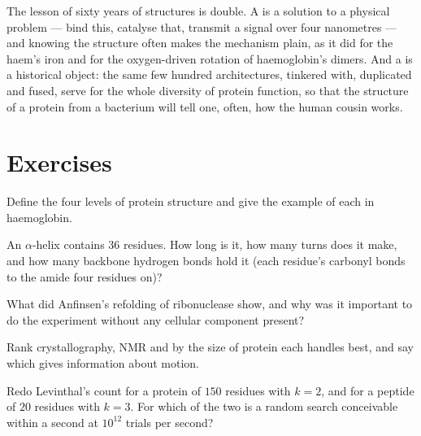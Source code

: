 \begin{remark}\label{rem:b3:structural-biology:sf}
The lesson of sixty years of structures is double. A  is a
solution to a physical problem --- bind this, catalyse that, transmit a
signal over four nanometres --- and knowing the structure often makes
the mechanism plain, as it did for the haem's iron and for the
oxygen-driven rotation of haemoglobin's dimers. And a  is a
historical object: the same few hundred architectures, tinkered with,
duplicated and fused, serve for the whole diversity of protein
function, so that the structure of a protein from a bacterium will tell
one, often, how the human cousin works.
\end{remark}

\section{Exercises}

\begin{exercise}[$\star$]\label{exo:b3:structural-biology:1}
Define the four levels of protein structure and give the example of
each in haemoglobin.
\end{exercise}

\begin{exercise}[$\star$]\label{exo:b3:structural-biology:2}
An $\alpha$-helix contains $36$ residues. How long is it, how many
turns does it make, and how many backbone hydrogen bonds hold it
(each residue's carbonyl bonds to the amide four residues on)?
\end{exercise}

\begin{exercise}[$\star$]\label{exo:b3:structural-biology:3}
What did Anfinsen's refolding of ribonuclease show, and why was it
important to do the experiment without any cellular component present?
\end{exercise}

\begin{exercise}[$\star$]\label{exo:b3:structural-biology:4}
Rank crystallography, NMR and  by the size of
protein each handles best, and say which gives information about
motion.
\end{exercise}

\begin{exercise}[$\star\star$]\label{exo:b3:structural-biology:5}
Redo Levinthal's count for a protein of $150$ residues with $k = 2$,
and for a peptide of $20$ residues with $k = 3$. For which of the two
is a random search conceivable within a second at $10^{12}$ trials per
second?
\end{exercise}

